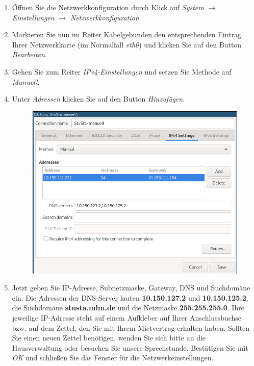 \documentclass[a4paper,12pt]{scrartcl}
\begin{document}
\begin{enumerate}
	\item Öffnen Sie die Netzwerkkonfiguration durch Klick auf \emph{System} $\rightarrow$ \emph{Einstellungen} $\rightarrow$ \emph{Netzwerkkonfiguration}.
	\item Markieren Sie nun im Reiter Kabelgebunden den entsprechenden Eintrag Ihrer Netzwerkkarte (im Normalfall \emph{eth0}) und klicken Sie auf den Button \emph{Bearbeiten}.
	\item Gehen Sie zum Reiter \emph{IPv4-Einstellungen} und setzen Sie Methode auf \emph{Manuell}.
	\item Unter \emph{Adressen} klicken Sie auf den Button \emph{Hinzufügen}.
	\begin{figure}[h!]
	\centering
		\begin{minipage}[c]{0.5\linewidth}
			\centering
			\includegraphics[width=0.9\linewidth,keepaspectratio]{Bilder/IP_Ubuntu_neu}
			\vspace{-15pt}
		\end{minipage}
	\end{figure}
	\item Jetzt geben Sie IP-Adresse, Subnetzmaske, Gateway, DNS und Suchdomäne ein. Die Adressen der DNS-Server lauten \textbf{10.150.127.2} und \textbf{10.150.125.2}, die Suchdomäne \textbf{stusta.mhn.de} und die Netzmaske \textbf{255.255.255.0}. Ihre jeweilige IP-Adresse steht auf einem Aufkleber auf Ihrer Anschlussbuchse bzw. auf dem Zettel, den Sie mit Ihrem Mietvertrag erhalten haben. Sollten Sie einen neuen Zettel benötigen, wenden Sie sich bitte an die Hausverwaltung oder besuchen Sie unsere Sprechstunde. Bestätigen Sie mit \emph{OK} und schließen Sie das Fenster für die Netzwerkeinstellungen.
\end{enumerate}
\end{document}
